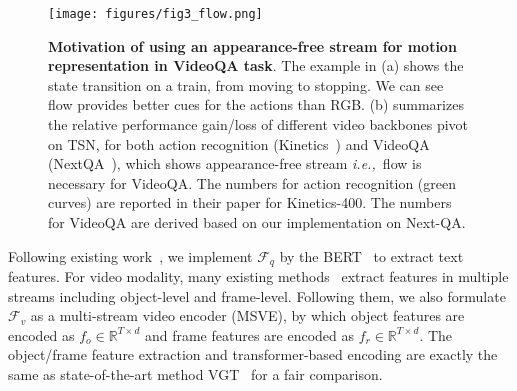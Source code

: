 \documentclass[sigconf]{acmart}
\newcommand{\ie}{\emph{i.e.,~}}
\begin{document}
\begin{figure}[t]
    \centering
    \texttt{[image: figures/fig3\_flow.png]}
    \caption{\textbf{Motivation of using an appearance-free stream for motion representation in VideoQA task}. The example in (a) shows the state transition on a train, from moving to stopping. We can see flow provides better cues for the actions than RGB. 
    (b) summarizes the relative performance gain/loss of different video backbones pivot on TSN, for both action recognition (Kinetics~\cite{carreira2017quo}) and VideoQA (NextQA~\cite{xiao2021next}), which shows appearance-free stream \ie flow is necessary for  VideoQA. The numbers for action recognition (green curves) are reported in their paper for Kinetics-400. The numbers for VideoQA are derived based on our implementation on Next-QA.  
    }
    \label{fig:flow}
\end{figure}

Following existing work~\cite{xiao2022vgt, li2022invariant}, we implement $\mathcal{F}_q$ by the BERT~\cite{devlin2018bert} to extract text features. For video modality, many existing methods~\cite{xiao2022vgt, xiao2022hqga} extract features in multiple streams including object-level and frame-level. Following them, we also formulate $\mathcal{F}_v$ as a multi-stream video encoder (MSVE), by which object features are encoded as $f_o \in \mathbb{R}^{{T}\times d}$ and frame features are encoded as $f_r \in \mathbb{R}^{{T}\times d}$. The object/frame feature extraction and transformer-based encoding are exactly the same as state-of-the-art method VGT~\cite{xiao2022vgt} for a fair comparison. 
\end{document}

